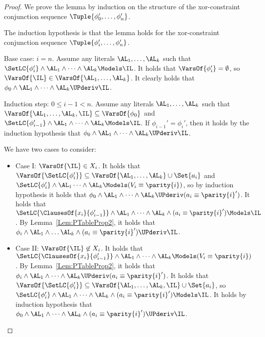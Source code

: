 \begin{proof}
We prove the lemma by induction on the structure of the xor-constraint conjunction
sequence $ \Tuple{\phi_0', \dots, \phi_n'} $.

The induction hypothesis is that the lemma holds for the xor-constraint conjunction
sequence $ \Tuple{\phi_{i}',\dots,\phi_n'} $.

Base case: $i = n$. 
Assume any literals $ \AL_1,\dots,\AL_k $ such that
$\SetLC{\phi_i'} \wedge \AL_1 \wedge \dots \wedge \AL_k \Models \IL $. 
It holds that $ \VarsOf{\phi_i'} = \emptyset $, so $ \VarsOf{\IL} \in \VarsOf{\AL_1, \dots, \AL_k}$. 
It clearly holds that $ \phi_0 \wedge \AL_1 \wedge \dots \wedge
\AL_k \UPderiv \IL $.

Induction step: $ 0 \leq i-1 < n $.
Assume any literals $ \AL_1,\dots,\AL_k $ such that $
\VarsOf{\AL_1,\dots,\AL_k,\IL} \subseteq \VarsOf{\phi_0} $ and $
\SetLC{\phi_{i-1}'} \wedge \AL_1 \wedge \dots \wedge \AL_k \Models \IL $. 
If $ \phi_{i-1}' = \phi_{i}'$, then it holds by the induction hypothesis that $ \phi_0 \wedge \AL_1 \wedge \dots \wedge \AL_k \UPderiv \IL $.


We have two cases to consider:
\begin{itemize}
\item Case I: $\VarsOf{\IL} \in X_i$. 
It holds that $ \VarsOf{\SetLC{\phi_{i}'}} 
  \subseteq \VarsOf{\AL_1,\dots,\AL_k} \cup \Set{a_{i}}$
  and $ \SetLC{\phi_i'} \wedge \AL_1 \dots \wedge \AL_k \Models (V_i \equiv \parity{i}) $,
  so by induction hypothesis it holds that $ \phi_0 \wedge \AL_1 \wedge \dots \wedge \AL_k \UPderiv (a_i \equiv \parity{i}') $. 
It holds that $ \SetLC{\ClausesOf{x_i}{\phi_{i-1}'}} \wedge \AL_1 \wedge \dots \wedge \AL_k \wedge (a_i \equiv \parity{i}') \Models \IL $. 
By Lemma~\ref{Lem:PTableProp2}, it holds that $ \phi_i \wedge \AL_1 \wedge \dots
\AL_k \wedge (a_i \equiv \parity{i}') \UPderiv \IL $.

\item Case II: $\VarsOf{\IL} \not \in X_i$. 
It holds that $ \SetLC{\ClausesOf{x_i}{\phi_{i-1}'}} \wedge \AL_1 \wedge \dots
\wedge \AL_k \Models (V_i \equiv \parity{i}) $.
By Lemma~\ref{Lem:PTableProp2}, it holds that $ \phi_i \wedge \AL_1 \wedge \dots \wedge \AL_k \UPderiv (a_i \equiv \parity{i}') $. 
It holds that $ \VarsOf{\SetLC{\phi_{i}'}} \subseteq \VarsOf{\AL_1, \dots, \AL_k, \IL} \cup \Set{a_i}$, so $\SetLC{\phi_{i}'} \wedge \AL_1 \wedge \dots \wedge \AL_k \wedge (a_i \equiv \parity{i}') \Models \IL$.
It holds by induction hypothesis that $ \phi_0 \wedge \AL_1 \wedge \dots \wedge \AL_k \wedge (a_i \equiv \parity{i}') \UPderiv \IL$.
\end{itemize}
\end{proof}

